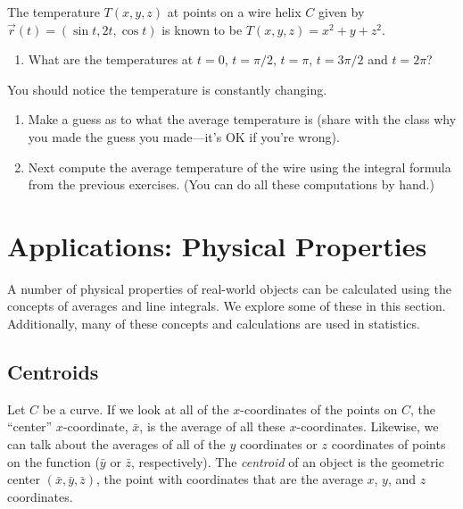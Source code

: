 \begin{problem}%
The temperature $T(x,y,z)$ at points on a wire helix $C$ given by $\vec r(t) = (\sin t, 2t, \cos t)$ is known to be $T(x,y,z)=x^2+y+z^2$. 
\begin{enumerate}
	\item What are the temperatures at $t=0$, $t=\pi/2$, $t=\pi$, $t=3\pi/2$ and $t=2\pi$?  
\end{enumerate}
You should notice the temperature is constantly changing.  
\begin{enumerate}[resume]
	\item Make a guess as to what the average temperature is (share with the class why you made the guess you made---it's OK if you're wrong). 
	\item Next compute the average temperature of the wire using the integral formula from the previous exercises. (You can do all these computations by hand.)
\end{enumerate}
\end{problem}


\section{Applications: Physical Properties}

A number of physical properties of real-world objects can be calculated using the concepts of averages and line integrals.  We explore some of these in this section.  Additionally, many of these concepts and calculations are used in statistics.

\subsection{Centroids}%

\begin{definition}[Centroid]
  Let $C$ be a curve. If we look at all of the $x$-coordinates of the points on $C$, the ``center'' $x$-coordinate, $\bar x$, is the average of all these $x$-coordinates.  Likewise, we can talk about the averages of all of the $y$ coordinates or $z$ coordinates of points on the function ($\bar y$ or $\bar z$, respectively).  The \emph{centroid} of an object is the geometric center $(\bar x, \bar y, \bar z)$, the point with coordinates that are the average $x$, $y$, and $z$ coordinates.
\end{definition}

